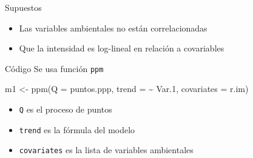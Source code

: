 \documentclass[
  11pt,
  ignorenonframetext,
]{beamer}
\newenvironment{Shaded}{}{}
\newcommand{\AttributeTok}[1]{\textcolor[rgb]{0.49,0.56,0.16}{#1}}
\newcommand{\FloatTok}[1]{\textcolor[rgb]{0.25,0.63,0.44}{#1}}
\newcommand{\FunctionTok}[1]{\textcolor[rgb]{0.02,0.16,0.49}{#1}}
\newcommand{\NormalTok}[1]{#1}
\newcommand{\OtherTok}[1]{\textcolor[rgb]{0.00,0.44,0.13}{#1}}
\newcommand{\SpecialCharTok}[1]{\textcolor[rgb]{0.25,0.44,0.63}{#1}}
\providecommand{\tightlist}{%
  \setlength{\itemsep}{0pt}\setlength{\parskip}{0pt}}
\begin{document}
\begin{frame}{Supuestos}
\protect\hypertarget{supuestos}{}
\begin{itemize}
\tightlist
\item
  Las variables ambientales no están correlacionadas
\item
  Que la intensidad es log-lineal en relación a covariables
\end{itemize}
\end{frame}

\begin{frame}[fragile]{Código}
\protect\hypertarget{cuxf3digo}{}
Se usa función \texttt{ppm}

\begin{Shaded}
\begin{Highlighting}[]
\NormalTok{m1 }\OtherTok{\textless{}{-}} \FunctionTok{ppm}\NormalTok{(}\AttributeTok{Q =}\NormalTok{ puntos.ppp,}
          \AttributeTok{trend =} \SpecialCharTok{\textasciitilde{}}\NormalTok{ Var}\FloatTok{.1}\NormalTok{,}
          \AttributeTok{covariates =}\NormalTok{ r.im)}
\end{Highlighting}
\end{Shaded}

\begin{itemize}
\tightlist
\item
  \texttt{Q} es el proceso de puntos
\item
  \texttt{trend} es la fórmula del modelo
\item
  \texttt{covariates} es la lista de variables ambientales
\end{itemize}
\end{frame}
\end{document}

